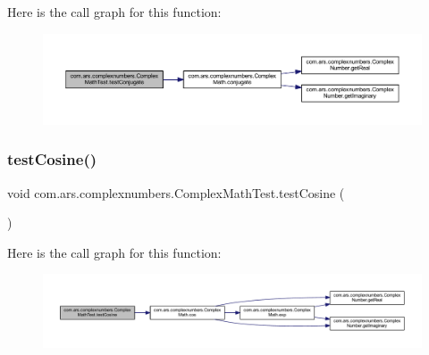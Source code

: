 Here is the call graph for this function\+:\nopagebreak
\begin{figure}[H]
\begin{center}
\leavevmode
\includegraphics[width=350pt]{classcom_1_1ars_1_1complexnumbers_1_1_complex_math_test_a29817014ba09b1d2f985882ddfcbfae2_cgraph}
\end{center}
\end{figure}
\hypertarget{classcom_1_1ars_1_1complexnumbers_1_1_complex_math_test_a453b6e66b0570b74892caa9ec83c47cb}{}\label{classcom_1_1ars_1_1complexnumbers_1_1_complex_math_test_a453b6e66b0570b74892caa9ec83c47cb} 
\subsubsection{\texorpdfstring{test\+Cosine()}{testCosine()}}
{\footnotesize\ttfamily void com.\+ars.\+complexnumbers.\+Complex\+Math\+Test.\+test\+Cosine (\begin{DoxyParamCaption}{ }\end{DoxyParamCaption})}

Here is the call graph for this function\+:\nopagebreak
\begin{figure}[H]
\begin{center}
\leavevmode
\includegraphics[width=350pt]{classcom_1_1ars_1_1complexnumbers_1_1_complex_math_test_a453b6e66b0570b74892caa9ec83c47cb_cgraph}
\end{center}
\end{figure}
\hypertarget{classcom_1_1ars_1_1complexnumbers_1_1_complex_math_test_a8ddaa1e32717e2b18f6c64010c688b6d}{}\label{classcom_1_1ars_1_1complexnumbers_1_1_complex_math_test_a8ddaa1e32717e2b18f6c64010c688b6d} 
